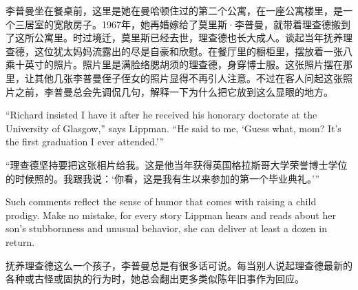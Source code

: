 \ifdefined\chs
李普曼坐在餐桌前，这里是她在曼哈顿住过的第二个公寓，在一座公寓楼里，是一个三居室的宽敞房子。1967年，她再婚嫁给了莫里斯·李普曼，就带着理查德搬到了这所公寓里。时过境迁，莫里斯已经去世，理查德也长大成人。谈起当年抚养理查德，这位犹太妈妈流露出的尽是自豪和欣慰。在餐厅里的橱柜里，摆放着一张八乘十英寸的照片。照片里是满脸络腮胡须的理查德，身穿博士服。这张照片摆在那里，让其他几张李普曼侄子侄女的照片显得不再引人注意。不过在客人问起这张照片之前，李普曼总会先调侃几句，解释一下为什么把它放到这么显眼的地方。
\fi

\ifdefined\eng
``Richard insisted I have it after he received his honorary doctorate at the University of Glasgow,'' says Lippman. ``He said to me, `Guess what, mom? It's the first graduation I ever attended.'\hspace{0.01in}''
\fi

\ifdefined\chs
“理查德坚持要把这张相片给我。这是他当年获得英国格拉斯哥大学荣誉博士学位的时候照的。我跟我说：‘你看，这是我有生以来参加的第一个毕业典礼。’”
\fi

\ifdefined\eng
Such comments reflect the sense of humor that comes with raising a child prodigy. Make no mistake, for every story Lippman hears and reads about her son's stubbornness and unusual behavior, she can deliver at least a dozen in return.
\fi

\ifdefined\chs
抚养理查德这么一个孩子，李普曼总是有很多话可说。每当别人说起理查德最新的各种或古怪或固执的行为时，她总会翻出更多类似陈年旧事作为回应。
\fi


